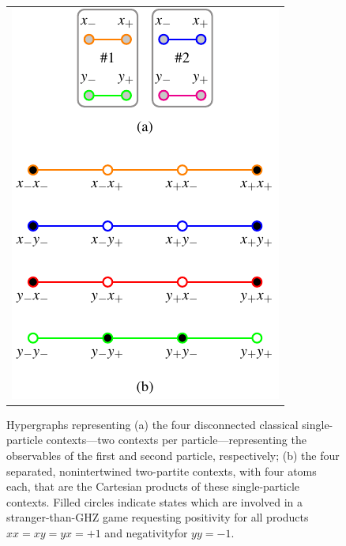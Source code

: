 \documentclass[sn-mathphys]{sn-jnl}%
\theoremstyle{thmstyleone}%
\theoremstyle{thmstyletwo}%
\theoremstyle{thmstylethree}%
\begin{document}
\begin{figure}[htb]%
\begin{center}
\begin{tabular}{ c }
\includegraphics{2020-ghz-exfigures-figure11}
\end{tabular}
\end{center}
\caption{\label{2020-f-ghz-contextconfstranger}
Hypergraphs representing
(a) the four disconnected classical single-particle contexts---two contexts per particle---representing the observables of the first and second particle, respectively;
(b) the four separated, nonintertwined two-partite contexts, with four atoms each, that are the Cartesian products of these single-particle contexts.
Filled circles indicate states which are involved in a stranger-than-GHZ game
requesting positivity for all products  $xx=xy=yx=+1$ and  negativityfor $yy=-1$.
}
\end{figure}
\end{document}
